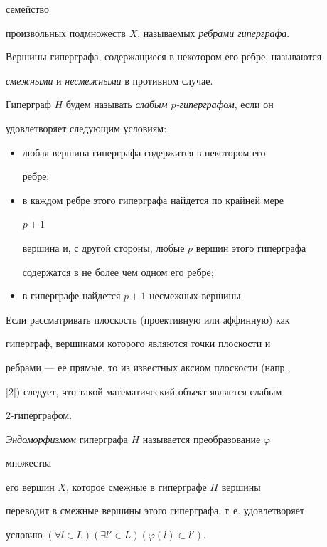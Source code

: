 семейство 


произвольных подмножеств $X$, называемых {\it ребрами гиперграфа}. 


Вершины гиперграфа, содержащиеся в некотором его ребре, называются 


{\it смежными} и {\it несмежными} в противном случае. 


 


Гиперграф $H$ будем называть {\it слабым $p$-гиперграфом}, если он 


удовлетворяет следующим условиям: 


\begin{itemize} 


\item[$(A_1)$]любая вершина гиперграфа содержится в некотором его 


ребре; 


\item[$(A_2)$]в каждом ребре этого гиперграфа найдется по крайней мере 


$p+1$ 


вершина и, с другой стороны, любые $p$ вершин этого гиперграфа 


содержатся в не более чем одном его ребре; 


\item[$(A_3)$]в гиперграфе найдется $p+1$ несмежных вершины. 


\end{itemize} 


 


Если рассматривать плоскость (проективную или аффинную) как 


гиперграф, вершинами которого являются точки плоскости и 


ребрами --- ее прямые, то из известных аксиом плоскости (напр., 


[2]) следует, что такой математический объект является слабым 


2-гиперграфом. 


 


{\it Эндоморфизмом} гиперграфа $H$ называется преобразование $\varphi$ 


множества 


его вершин $X$, которое смежные в гиперграфе $H$ вершины 


переводит в смежные вершины этого гиперграфа, т.\,е. удовлетворяет 


условию $(\forall l\in L)(\exists l'\in L)(\varphi(l)\subset l')$. 


